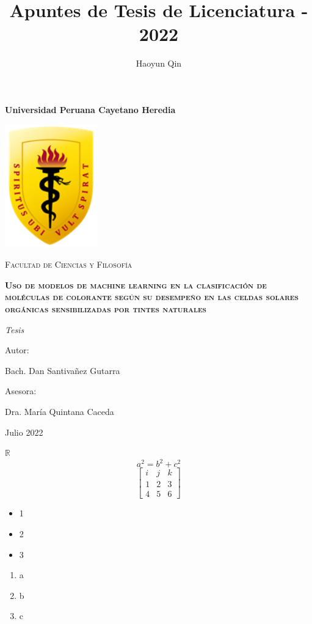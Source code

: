 \documentclass{article}
\title{Apuntes de Tesis de Licenciatura - 2022}
\author{Haoyun Qin}
\theoremstyle{mytheoremstyle}
\theoremstyle{mytheoremstyle}
\theoremstyle{myproblemstyle}
\begin{document}
    \begin{titlepage}
        \centering
        {\bfseries\LARGE Universidad Peruana Cayetano Heredia \par}
        \vspace{1cm}
        {\includegraphics[width=0.3\textwidth]{img/logo_escudo.png}\par}
        \vspace{1cm}
        {\scshape\Large Facultad de Ciencias y Filosofía \par}
        \vspace{1cm}
        {\bfseries\scshape\Large Uso de modelos de machine learning en la clasificación de moléculas de colorante según su desempeño en las celdas solares orgánicas sensibilizadas por tintes naturales \par}
        \vspace{1cm}
        {\itshape\Large Tesis \par}
        \vfill
        {\Large Autor: \par}
        {\Large Bach. Dan Santivañez Gutarra\par}
        \vfill
        {\Large Asesora: \par}
        {\Large Dra. María Quintana Caceda \par}
        \vfill
        {\Large Julio 2022 \par}
    \end{titlepage}


    \lipsum[2]

    $\mathbb{R}$
    \begin{equation}
        a^2=b^2+c^2
    \end{equation}
    \begin{equation}
        \begin{bmatrix}
            i&j&k\\
            1&2&3\\
            4&5&6
        \end{bmatrix}
    \end{equation}
    \begin{itemize}
        \item 1
        \item 2
        \item 3
    \end{itemize}
    \begin{enumerate}
        \item a
        \item b
        \item c
    \end{enumerate}
\end{document}

